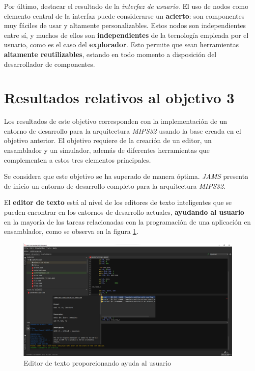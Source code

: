 Por último, destacar el resultado de la \textit{interfaz de usuario}.
El uso de nodos como elemento central de la interfaz puede considerarse
un \textbf{acierto}: son componentes muy fáciles de usar y altamente personalizables.
Estos nodos son independientes entre sí, y muchos de ellos son \textbf{independientes}
de la tecnología empleada por el usuario, como es el caso del \textbf{explorador}.
Esto permite que sean herramientas \textbf{altamente reutilizables}, estando en todo
momento a disposición del desarrollador de componentes.


\section{Resultados relativos al objetivo 3}\label{sec:resultados-relativos-al-objetivo-3}

Los resultados de este objetivo corresponden con la implementación
de un entorno de desarrollo para la arquitectura \textit{MIPS32}
usando la base creada en el objetivo anterior.
El objetivo requiere de la creación de un editor, un ensamblador
y un simulador, además de diferentes herramientas que complementen
a estos tres elementos principales.

Se considera que este objetivo se ha superado
de manera óptima.
\textit{JAMS} presenta de inicio un entorno de desarrollo completo
para la arquitectura \textit{MIPS32}.

El \textbf{editor de texto} está al nivel de los editores de texto
inteligentes que se pueden encontrar en los entornos de desarrollo
actuales, \textbf{ayudando al usuario} en la mayoría de las tareas
relacionadas con la programación de una aplicación en ensamblador, como se observa
en la figura \ref{fig:mips-editor}.

\begin{figure}[ht]
    \centering
    \includegraphics[width=\textwidth]{images/result/mips-editor}
    \caption{Editor de texto proporcionando ayuda al usuario}
    \label{fig:mips-editor}
\end{figure}

